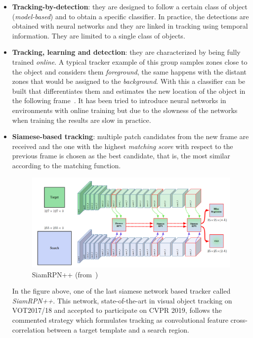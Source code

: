 \begin{itemize}
\item \textbf{Tracking-by-detection}: they are designed to follow a certain class of object (\textit{model-based}) and to obtain a specific classifier. In practice, the detections are obtained with neural networks and they are linked in tracking using temporal information. They are limited to a single class of objects.
\item \textbf{Tracking, learning and detection}: they are characterized by being fully trained \textit{online}. A typical tracker example of this group samples zones close to the object and considers them \textit{foreground}, the same happens with the distant zones that would be assigned to the \textit{background}. With this a classifier can be built that differentiates them and estimates the new location of the object in the following frame~\cite{babenko2009visual}. It has been tried to introduce neural networks in environments with online training but due to the slowness of the networks when training the results are slow in practice.
\item \textbf{Siamese-based tracking}: multiple patch candidates from the new frame are received and the one with the highest \textit{matching score} with respect to the previous frame is chosen as the best candidate, that is, the most similar according to the matching function.
\begin{figure}[H]
\begin{center}
\includegraphics[scale=0.3]{figures/siamese.png}
\caption{SiamRPN++ (from~\cite{li2018siamrpn++})}
\label{fig:pn}
\end{center}
\end{figure}
In the figure above, one of the last siamese network based tracker called \textit{SiamRPN++}. This network, state-of-the-art in visual object tracking on VOT2017/18 and accepted to participate on CVPR 2019, follows the commented strategy which formulates tracking as convolutional feature cross-correlation between a target template and a search region.

\end{itemize}
